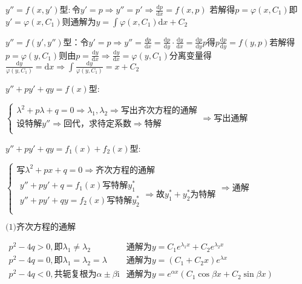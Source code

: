 \begin{spacing}{2.2}
    {\color{red} $y''=f(x, y')$}型$\colon$令$y' = p \Rightarrow y'' = p' \Rightarrow \frac{\mathrm{d}p}{\mathrm{d}x} = f(x, p)$
    若解得$p = \varphi(x, C_1)$即$y' = \varphi(x, C_1)$则通解为$\displaystyle y = \int{\varphi(x, C_1)\mathrm{d}x} +C_2$

    {\color{red} $y''=f(y', y'')$}型：令$y' = p \Rightarrow y'' = \frac{\mathrm{}{d}p}{\mathrm{d}x} = \frac{\mathrm{d}p}{\mathrm{d}y} \cdot \frac{\mathrm{d}y}{\mathrm{d}x} = \frac{\mathrm{d}p}{\mathrm{d}y}p$得$p\frac{\mathrm{d}p}{\mathrm{d}y} = f(y, p)$若解得$p = \varphi(y, C_1)$则由$p = \frac{\mathrm{d}y}{\mathrm{d}x} \Rightarrow \frac{\mathrm{d}y}{\mathrm{d}x} = \varphi(y, C_1)$分离变量得$\displaystyle \frac{\mathrm{d}y}{\varphi(y, C_1)} = \mathrm{d}x \Rightarrow \int{\frac{\mathrm{d}y}{\varphi(y, C_1)}} = x + C_2$

    {\color{red} $y'' + py' + qy = f(x)$}型$\colon$

    \noindent $\left\{
        \begin{array}{l}
            \lambda^2 + p\lambda + q = 0 \Rightarrow \lambda_1, \lambda_2 \Rightarrow \mbox{写出齐次方程的通解}\\
            \mbox{设特解}y'' \Rightarrow \mbox{回代，求待定系数} \Rightarrow \mbox{特解} \\
        \end{array}
    \right.
    \Rightarrow \mbox{写出通解}$

    {\color{red} $y'' + py' + qy = f_1(x) + f_2(x)$}型$\colon$

    \noindent $\left\{
        \begin{array}{l}
            \mbox{写}\lambda^2 + px + q = 0 \Rightarrow \mbox{齐次方程的通解} \\
            \begin{array}{l}
                y'' + py' + q = f_1(x) \mbox{写特解}y_{1}^{*} \\
                y'' + py' + qy = f_2(x) \mbox{写特解}y_{2}^{*} \\
            \end{array} \Rightarrow \mbox{故}y_{1}^{*} + y_{2}^{*}\mbox{为特解}
        \end{array}
    \right. \Rightarrow \mbox{通解}$

    \noindent $\mbox{(1)齐次方程的通解}$

    \noindent $\begin{array}{ll}
        p^2-4q > 0,\mbox{即} \lambda_1 \neq \lambda_2 & \mbox{通解为}y = C_1e^{\lambda_1x} + C_2e^{\lambda_2x}\\
        p^2-4q = 0,\mbox{即} \lambda_1 = \lambda_2 = \lambda & \mbox{通解为}y = (C_1 + C_2x)e^{\lambda x}\\
        p^2-4q < 0,\mbox{共轭复根为}\alpha \pm \beta \mathrm{i} & \mbox{通解为}y = e^{\alpha x}(C_1\cos{\beta x} + C_2\sin{\beta x})\\
    \end{array}$


\end{spacing}
